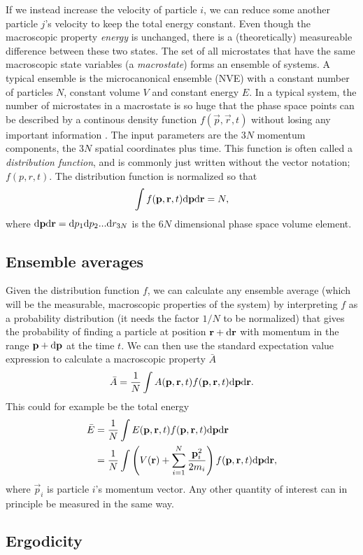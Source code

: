 If we instead increase the velocity of particle $i$, we can reduce some another particle $j$'s velocity to keep the total energy constant. Even though the macroscopic property \textit{energy} is unchanged, there is a (theoretically) measureable difference between these two states. The set of all microstates that have the same macroscopic state variables (a \textit{macrostate}) forms an ensemble of systems. A typical ensemble is the microcanonical ensemble (NVE) with a constant number of particles $N$, constant volume $V$ and constant energy $E$. In a typical system, the number of microstates in a macrostate is so huge that the phase space points can be described by a continous density function $f(\vec p, \vec r, t)$ without losing any important information \cite{mcquarrie1973statistical}. The input parameters are the $3N$ momentum components, the $3N$ spatial coordinates plus time. This function is often called a \textit{distribution function}, and is commonly just written without the vector notation; $f(p, r, t)$. The distribution function is normalized so that
\begin{align}
	\int f(\mathbf p, \mathbf r, t) \mathrm{d}\mathbf p\mathrm{d}\mathbf r = N,
\end{align}
where $\mathrm{d}\mathbf p\mathrm{d}\mathbf r=\mathrm{d}p_1\mathrm{d}p_2...\mathrm{d}r_{3N}$ is the $6N$ dimensional phase space volume element. 

\subsection{Ensemble averages}
Given the distribution function $f$, we can calculate any ensemble average (which will be the measurable, macroscopic properties of the system) by interpreting $f$ as a probability distribution (it needs the factor $1/N$ to be normalized) that gives the probability of finding a particle at position $\mathbf r + \mathrm{d}\mathbf r$ with momentum in the range $\mathbf p + \mathrm{d}\mathbf p$ at the time $t$. We can then use the standard expectation value expression to calculate a macroscopic property $\bar A$
\begin{align}
	\bar A = \frac{1}{ N}\int A(\mathbf p, \mathbf r, t)f(\mathbf p, \mathbf r, t)\mathrm{d}\mathbf p\mathrm{d}\mathbf r.
\end{align}
This could for example be the total energy
\begin{align}
	\bar E &= \frac{1}{ N}\int E(\mathbf p, \mathbf r, t)f(\mathbf p, \mathbf r, t)\mathrm{d}\mathbf p\mathrm{d}\mathbf r \\
	&= \frac{1}{ N}\int \left(V(\mathbf r) + \sum_{i=1}^N \frac{\mathbf p_i^2}{2m_i} \right)f(\mathbf p, \mathbf r, t)\mathrm{d}\mathbf p \mathrm{d}\mathbf r,
\end{align}
where $\vec p_i$ is particle $i$'s momentum vector. Any other quantity of interest can in principle be measured in the same way. 
\subsection{Ergodicity}